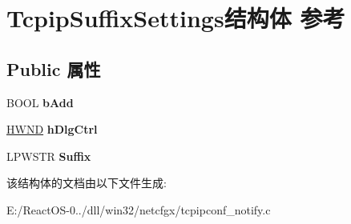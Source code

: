 \hypertarget{struct_tcpip_suffix_settings}{}\section{Tcpip\+Suffix\+Settings结构体 参考}
\label{struct_tcpip_suffix_settings}
\subsection*{Public 属性}
\begin{DoxyCompactItemize}
\item 
\mbox{\label{struct_tcpip_suffix_settings_a69a5874730456d7445becaf984398eba}} 
B\+O\+OL {\bfseries b\+Add}
\item 
\mbox{\label{struct_tcpip_suffix_settings_ab084a273fe32fd99f5f4c17e020c09b0}} 
\hyperlink{interfacevoid}{H\+W\+ND} {\bfseries h\+Dlg\+Ctrl}
\item 
\mbox{\label{struct_tcpip_suffix_settings_a1d0554ce49eab1ae2e322e97d908962c}} 
L\+P\+W\+S\+TR {\bfseries Suffix}
\end{DoxyCompactItemize}


该结构体的文档由以下文件生成\+:\begin{DoxyCompactItemize}
\item 
E\+:/\+React\+O\+S-\/0../dll/win32/netcfgx/tcpipconf\+\_\+notify.\+c\end{DoxyCompactItemize}
